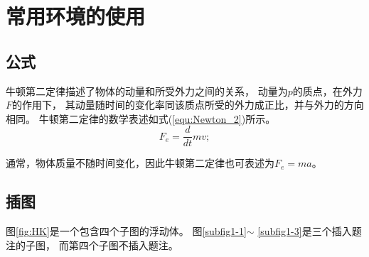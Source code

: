 
\chapter{常用环境的使用}
\section{公式}
牛顿第二定律描述了物体的动量和所受外力之间的关系，
动量为$p$的质点，在外力$F$的作用下，
其动量随时间的变化率同该质点所受的外力成正比，并与外力的方向相同。
牛顿第二定律的数学表述如式(\ref{equ:Newton_2})所示。
\begin{equation}
  F_e=\frac{d}{dt}mv;
  \label{equ:Newton_2}
\end{equation}

\begin{note}
\end{note}

通常，物体质量不随时间变化，因此牛顿第二定律也可表述为$F_e=ma$。


\section{插图}
图\ref{fig:HK}是一个包含四个子图的浮动体。
图\ref{subfig1-1}$\sim$ \ref{subfig1-3}是三个插入题注的子图，
而第四个子图不插入题注。

